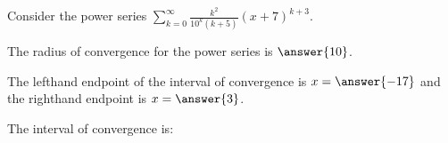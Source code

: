 \documentclass{ximera}
\author{Jim Talamo}
\begin{document}
\begin{exercise}
Consider the power series $\sum_{k=0}^{\infty} \frac{k^2 }{10^k (k+5)}(x+7)^{k+3}$.

The radius of convergence for the power series is $\answer{10}$.

The lefthand endpoint of the interval of convergence is $x=\answer{-17}$ and the righthand endpoint is $x= \answer{3}$.

\begin{exercise}
The interval of convergence is:
\begin{multipleChoice}
\choice{$(-17,3]$}
\choice{$[-17,3)$}
\choice{$[-17,3]$}
\end{multipleChoice}

\end{exercise}
\end{exercise}
\end{document}
